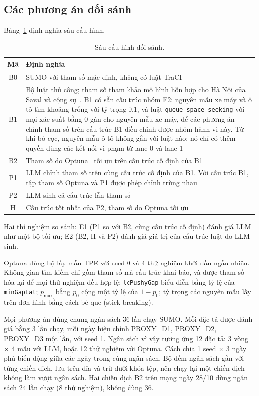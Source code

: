 \documentclass[../DoAn.tex]{subfiles}
\begin{document}
\subsection{Các phương án đối sánh}

Bảng~\ref{table:3.4} định nghĩa sáu cấu hình.

\begin{table}[ht]
\centering
\small
\caption{Sáu cấu hình đối sánh.}
\label{table:3.4}
\begin{tabular}{|c|p{12.5cm}|}
\hline
\textbf{Mã} & \textbf{Định nghĩa} \\
\hline
B0 & SUMO với tham số mặc định, không có luật TraCI \\
\hline
B1 & Bộ luật thủ công; tham số tham khảo mô hình hỗn hợp cho Hà Nội của Saval và cộng sự~\cite{saval2023mixed}. B1 có sẵn cấu trúc nhóm F2: nguyên mẫu xe máy và ô tô tìm khoảng trống với tỷ trọng 0,1, và luật \texttt{queue\_space\_seeking} với mọi xác suất bằng 0 gán cho nguyên mẫu xe máy, để các phương án chỉnh tham số trên cấu trúc B1 điều chỉnh được nhóm hành vi này. Từ khi bỏ cọc, nguyên mẫu ô tô không gắn với luật nào; nó chỉ có thêm quyền dùng các kết nối vi phạm từ lane 0 và lane 1 \\
\hline
B2 & Tham số do Optuna~\cite{akiba2019optuna} tối ưu trên cấu trúc cố định của B1 \\
\hline
P1 & LLM chỉnh tham số trên cùng cấu trúc cố định của B1. Với cấu trúc B1, tập tham số Optuna và P1 được phép chỉnh trùng nhau \\
\hline
P2 & LLM sinh cả cấu trúc lẫn tham số \\
\hline
H & Cấu trúc tốt nhất của P2, tham số do Optuna tối ưu \\
\hline
\end{tabular}
\end{table}

Hai thí nghiệm so sánh: E1 (P1 so với B2, cùng cấu trúc cố định) đánh giá LLM như một bộ tối ưu; E2 (B2, H và P2) đánh giá giá trị của cấu trúc luật do LLM sinh.

Optuna dùng bộ lấy mẫu TPE với seed 0 và 4 thử nghiệm khởi đầu ngẫu nhiên. Không gian tìm kiếm chỉ gồm tham số mà cấu trúc khai báo, và được tham số hóa lại để mọi thử nghiệm đều hợp lệ: \texttt{lcPushyGap} biểu diễn bằng tỷ lệ của \texttt{minGapLat}; $p_{\max}$ bằng $p_0$ cộng một tỷ lệ của $1-p_0$; tỷ trọng các nguyên mẫu lấy trên đơn hình bằng cách bẻ que (stick-breaking).

Mọi phương án dùng chung ngân sách 36 lần chạy SUMO. Mỗi đặc tả được đánh giá bằng 3 lần chạy, mỗi ngày hiệu chỉnh PROXY\_D1, PROXY\_D2, PROXY\_D3 một lần, với seed 1. Ngân sách vì vậy tương ứng 12 đặc tả: 3 vòng $\times$ 4 mẫu với LLM, hoặc 12 thử nghiệm với Optuna. Cách chia 1 seed $\times$ 3 ngày phủ biến động giữa các ngày trong cùng ngân sách. Bộ đếm ngân sách gắn với từng chiến dịch, lưu trên đĩa và trừ dưới khóa tệp, nên chạy lại một chiến dịch không làm vượt ngân sách. Hai chiến dịch B2 trên mạng ngày 28/10 dùng ngân sách 24 lần chạy (8 thử nghiệm), không dùng 36.
\end{document}
